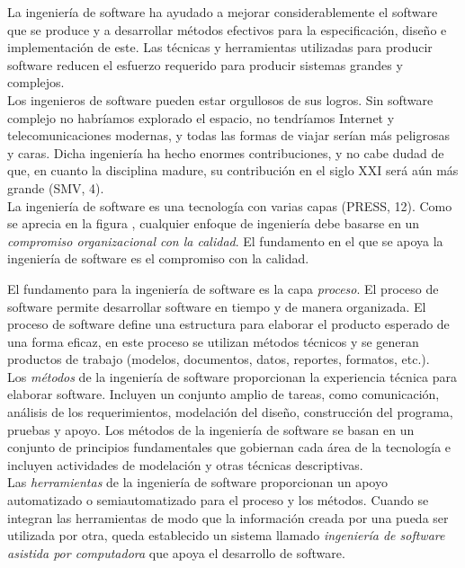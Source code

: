 La ingeniería de software ha ayudado a mejorar considerablemente el software que se produce y a desarrollar métodos efectivos para la especificación, diseño 
e implementación de este. Las técnicas y herramientas utilizadas para producir software reducen el esfuerzo requerido para producir sistemas grandes y complejos.\\

Los ingenieros de software pueden estar orgullosos de sus logros. Sin software complejo
no habríamos explorado el espacio, no tendríamos Internet y telecomunicaciones modernas,
y todas las formas de viajar serían más peligrosas y caras. Dicha ingeniería ha hecho enormes
contribuciones, y no cabe dudad de que, en cuanto la disciplina madure, su contribución en el
siglo XXI será aún más grande (SMV, 4).\\

La ingeniería de software es una tecnología con varias capas (PRESS, 12). Como se aprecia en la figura
, cualquier enfoque de ingeniería debe basarse en un \emph{compromiso
organizacional con la calidad}. El fundamento en el que se apoya la ingeniería de software es el compromiso con la calidad.\\


El fundamento para la ingeniería de software es la capa \emph{proceso}. El proceso de software permite desarrollar software en tiempo y de manera organizada.
El proceso de software define una estructura para elaborar el producto esperado de una forma eficaz, en este proceso
se utilizan métodos técnicos y se generan productos de trabajo (modelos, documentos, datos,
reportes, formatos, etc.).\\

Los \emph{métodos} de la ingeniería de software proporcionan la experiencia técnica para elaborar
software. Incluyen un conjunto amplio de tareas, como comunicación, análisis de los requerimientos, 
modelación del diseño, construcción del programa, pruebas y apoyo. Los métodos de
la ingeniería de software se basan en un conjunto de principios fundamentales que gobiernan
cada área de la tecnología e incluyen actividades de modelación y otras técnicas descriptivas. \\

Las \emph{herramientas} de la ingeniería de software proporcionan un apoyo automatizado o semiautomatizado 
para el proceso y los métodos. Cuando se integran las herramientas de modo
que la información creada por una pueda ser utilizada por otra, queda establecido un sistema
llamado \emph{ingeniería de software asistida por computadora} que apoya el desarrollo de software.\\

